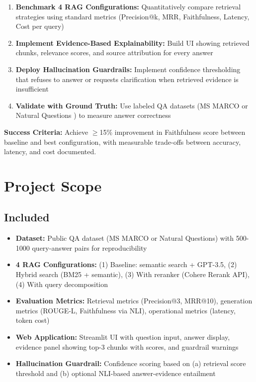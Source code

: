 \documentclass[11pt,a4paper]{article}
\begin{document}
\begin{enumerate}[leftmargin=*]
    \item \textbf{Benchmark 4 RAG Configurations:} Quantitatively compare retrieval strategies using standard metrics (Precision@k, MRR, Faithfulness, Latency, Cost per query)
    \item \textbf{Implement Evidence-Based Explainability:} Build UI showing retrieved chunks, relevance scores, and source attribution for every answer
    \item \textbf{Deploy Hallucination Guardrails:} Implement confidence thresholding that refuses to answer or requests clarification when retrieved evidence is insufficient
    \item \textbf{Validate with Ground Truth:} Use labeled QA datasets (MS MARCO \cite{bajaj2016msmarco} or Natural Questions \cite{kwiatkowski2019natural}) to measure answer correctness
\end{enumerate}

\textbf{Success Criteria:} Achieve $\geq$15\% improvement in Faithfulness score between baseline and best configuration, with measurable trade-offs between accuracy, latency, and cost documented.

\section{Project Scope}

\subsection{Included}
\begin{itemize}[leftmargin=*]
    \item \textbf{Dataset:} Public QA dataset (MS MARCO or Natural Questions) with 500-1000 query-answer pairs for reproducibility
    \item \textbf{4 RAG Configurations:} (1) Baseline: semantic search + GPT-3.5, (2) Hybrid search (BM25 + semantic), (3) With reranker (Cohere Rerank API), (4) With query decomposition
    \item \textbf{Evaluation Metrics:} Retrieval metrics (Precision@3, MRR@10), generation metrics (ROUGE-L, Faithfulness via NLI), operational metrics (latency, token cost)
    \item \textbf{Web Application:} Streamlit UI with question input, answer display, evidence panel showing top-3 chunks with scores, and guardrail warnings
    \item \textbf{Hallucination Guardrail:} Confidence scoring based on (a) retrieval score threshold and (b) optional NLI-based answer-evidence entailment
\end{itemize}
\end{document}
